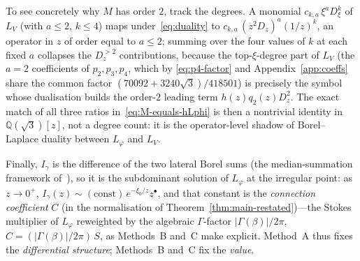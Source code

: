 \documentclass[11pt,reqno]{amsart}
\theoremstyle{plain}
\theoremstyle{definition}
\newcommand{\Lphi}{L_{\varphi}}
\newcommand{\LV}{L_{V}}
\newcommand{\Qsqrt}{\mathbb{Q}(\sqrt3)}
\newcommand{\xizero}{\xi_0}
\providecommand{\C}{}\renewcommand{\C}{C}
\begin{document}
To see concretely why $M$ has order $2$, track the degrees. A monomial $c_{k,a}\,\xi^a D_\xi^k$ of
$\LV$ (with $a\le2$, $k\le4$) maps under~\eqref{eq:duality} to
$c_{k,a}\,(z^2D_z)^a(1/z)^k$, an operator in $z$ of order equal to $a\le2$; summing over the four
values of $k$ at each fixed $a$ collapses the $D_z^{>2}$ contributions, because the
top-$\xi$-degree part of $\LV$ (the $a=2$ coefficients of $p_2,p_3,p_4$, which by
\eqref{eq:p4-factor} and Appendix~\ref{app:coeffs} share the common factor
$(70092+3240\sqrt3)/418501$) is precisely the symbol whose dualisation builds the order-$2$ leading
term $h(z)q_2(z)D_z^2$. The exact match of all three ratios in~\eqref{eq:M-equals-hLphi} is then a
nontrivial identity in $\Qsqrt[z]$, not a degree count: it is the operator-level shadow of
Borel--Laplace duality between $\Lphi$ and $\LV$.

Finally, $I_\gamma$ is the difference of the two lateral Borel sums (the median-summation
framework of~\cite{LodayRichaud}), so it is the subdominant
solution of $\Lphi$ at the irregular point: as $z\to0^+$, $I_\gamma(z)\sim(\text{const})\,
e^{-\xizero/z}z^{\bullet}$, and that constant is the \emph{connection coefficient} $\C$
(in the normalisation of Theorem~\ref{thm:main-restated})---the Stokes multiplier of $\Lphi$
reweighted by the algebraic $\Gamma$-factor $\lvert\Gamma(\beta)\rvert/2\pi$,
$\C=(\lvert\Gamma(\beta)\rvert/2\pi)\,S$, as Methods~B and~C make explicit. Method~A thus fixes the
\emph{differential structure}; Methods~B and~C fix the \emph{value}.
\end{document}

